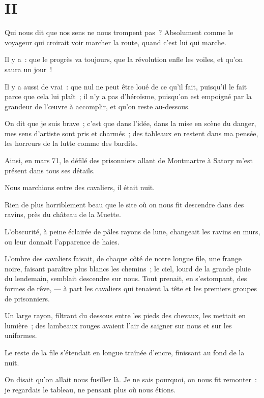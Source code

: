 \documentclass[french,twoside]{book} %
\newcommand\chapteropen{} %
\newcommand\chaptercont{} %
\begin{document}
\chapteropen
 \chapter[{II}]{II}
\label{p2.2}

\chaptercont
\noindent Qui nous dit que nos sens ne nous trompent pas ? Absolument comme le voyageur qui croirait voir marcher la route, quand c’est lui qui marche.\par
Il y a : que le progrès va toujours, que la révolution enfle les voiles, et qu’on saura un jour !\par
Il y a aussi de vrai : que nul ne peut être loué de ce qu’il fait, puisqu’il le fait parce que cela lui plaît ; il n’y a pas d’héroïsme, puisqu’on est empoigné par la grandeur de l’œuvre à accomplir, et qu’on reste au-dessous.\par
On dit que je suis brave ; c’est que dans l’idée, dans la mise en scène du danger, mes sens d’artiste sont pris et charmés ; des tableaux en restent dans ma pensée, les horreurs de la lutte comme des bardits.\par
Ainsi, en mars 71, le défilé des prisonniers allant de Montmartre à Satory m’est présent dans tous ses détails.\par
 Nous marchions entre des cavaliers, il était nuit.\par
Rien de plus horriblement beau que le site où on nous fit descendre dans des ravins, près du château de la Muette.\par
L’obscurité, à peine éclairée de pâles rayons de lune, changeait les ravins en murs, ou leur donnait l’apparence de haies.\par
L’ombre des cavaliers faisait, de chaque côté de notre longue file, une frange noire, faisant paraître plus blancs les chemins ; le ciel, lourd de la grande pluie du lendemain, semblait descendre sur nous. Tout prenait, en s’estompant, des formes de rêve, — à part les cavaliers qui tenaient la tête et les premiers groupes de prisonniers.\par
Un large rayon, filtrant du dessous entre les pieds des chevaux, les mettait en lumière ; des lambeaux rouges avaient l’air de saigner sur nous et sur les uniformes.\par
Le reste de la file s’étendait en longue traînée d’encre, finissant au fond de la nuit.\par
On disait qu’on allait nous fusiller là. Je ne sais pourquoi, on nous fit remonter : je regardais le tableau, ne pensant plus où nous étions.\par
\end{document}
